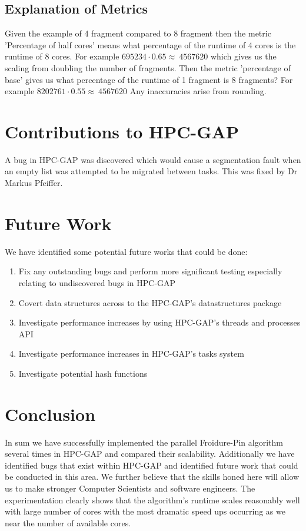\documentclass{report}
\begin{document}
\subsection*{Explanation of Metrics}
Given the example of 4 fragment compared to 8 fragment then the metric 'Percentage of half cores' means what percentage of the runtime of 4 cores is the runtime of 8 cores.
\newline
For example $695234 \cdot 0.65 \approx ~4567620$ which gives us the scaling from doubling the number of fragments. 
\newline
Then the metric 'percentage of base' gives us what percentage of the runtime of 1 fragment is 8 fragments?
\newline
For example $8202761 \cdot 0.55 \approx ~4567620$
\newline
Any inaccuracies arise from rounding. 
\section*{Contributions to HPC-GAP}
A bug in HPC-GAP was discovered which would cause a segmentation fault when an empty list was attempted to be migrated between tasks.
This was fixed by Dr Markus Pfeiffer\cite{hpcsol}.

\section*{Future Work}
We have identified some potential future works that could be done:

\begin{enumerate}
\item Fix any outstanding bugs and perform more significant testing especially relating to undiscovered bugs in HPC-GAP
\item Covert data structures across to the HPC-GAP's datastructures package\cite{ds}
\item Investigate performance increases by using HPC-GAP's threads and processes API
\item Investigate performance increases in HPC-GAP's tasks system
\item Investigate potential hash functions
\end{enumerate}

\section*{Conclusion}
In sum we have successfully implemented the parallel Froidure-Pin algorithm several times in HPC-GAP and compared their scalability.
Additionally we have identified bugs that exist within HPC-GAP and identified future work that could be conducted in this area.
\newline
We further believe that the skills honed here will allow us to make stronger Computer Scientists and software engineers.
\newline
The experimentation clearly shows that the algorithm's runtime scales reasonably well with large number of cores with the most dramatic speed ups occurring as we near the number of available cores. 
\end{document}
